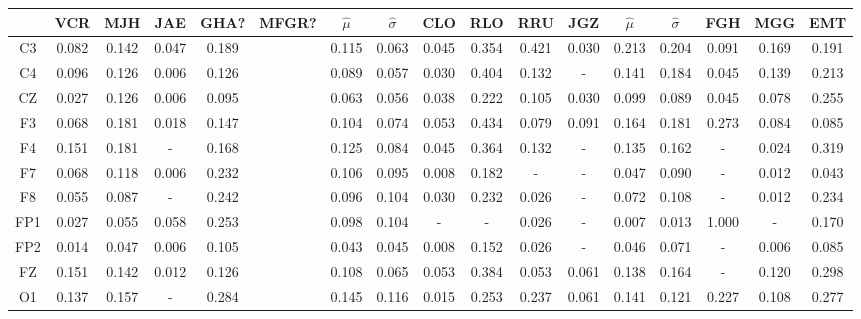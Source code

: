 \begin{SidewaysFigure}
\centering
\begin{tabular}{c||ccccc|cc||cccc|cc||ccc}
& VCR & MJH & JAE & GHA? & MFGR? &$\widehat{\mu}$ & $\widehat{\sigma}$
& CLO & RLO & RRU & JGZ &$\widehat{\mu}$ & $\widehat{\sigma}$
& FGH & MGG & EMT \\
\hline
 C3 & 0.082    & 0.142    & 0.047    & 0.189    && 0.115    & 0.063    & 0.045    & 0.354    & 0.421    & 0.030    & 0.213    & 0.204    & 0.091    & 0.169    & 0.191     \\
 C4 & 0.096    & 0.126    & 0.006    & 0.126    && 0.089    & 0.057    & 0.030    & 0.404    & 0.132    & -      & 0.141    & 0.184    & 0.045    & 0.139    & 0.213     \\
 CZ & 0.027    & 0.126    & 0.006    & 0.095    && 0.063    & 0.056    & 0.038    & 0.222    & 0.105    & 0.030    & 0.099    & 0.089    & 0.045    & 0.078    & 0.255     \\
 F3 & 0.068    & 0.181    & 0.018    & 0.147    && 0.104    & 0.074    & 0.053    & 0.434    & 0.079    & 0.091    & 0.164    & 0.181    & 0.273    & 0.084    & 0.085     \\
 F4 & 0.151    & 0.181    & -      & 0.168    && 0.125    & 0.084    & 0.045    & 0.364    & 0.132    & -      & 0.135    & 0.162    & -      & 0.024    & 0.319     \\
 F7 & 0.068    & 0.118    & 0.006    & 0.232    && 0.106    & 0.095    & 0.008    & 0.182    & -      & -      & 0.047    & 0.090    & -      & 0.012    & 0.043     \\
 F8 & 0.055    & 0.087    & -      & 0.242    && 0.096    & 0.104    & 0.030    & 0.232    & 0.026    & -      & 0.072    & 0.108    & -      & 0.012    & 0.234     \\
 FP1 & 0.027    & 0.055    & 0.058    & 0.253    && 0.098    & 0.104    & -      & -      & 0.026    & -      & 0.007    & 0.013    & 1.000    & -      & 0.170     \\
 FP2 & 0.014    & 0.047    & 0.006    & 0.105    && 0.043    & 0.045    & 0.008    & 0.152    & 0.026    & -      & 0.046    & 0.071    & -      & 0.006    & 0.085     \\
 FZ & 0.151    & 0.142    & 0.012    & 0.126    && 0.108    & 0.065    & 0.053    & 0.384    & 0.053    & 0.061    & 0.138    & 0.164    & -      & 0.120    & 0.298     \\
 O1 & 0.137    & 0.157    & -      & 0.284    && 0.145    & 0.116    & 0.015    & 0.253    & 0.237    & 0.061    & 0.141    & 0.121    & 0.227    & 0.108    & 0.277     \\

\end{tabular}
\end{SidewaysFigure}
